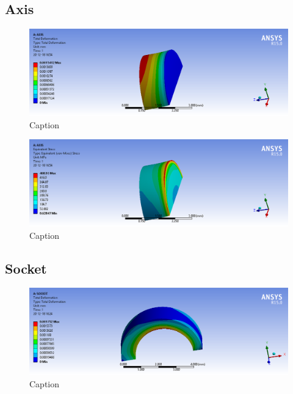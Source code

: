 \documentclass[a4paper 12pt]{article}
\begin{document}
\subsection{Axis}

\begin{figure}[!ht]
    \centering
    \includegraphics[width=1\textwidth]{images/AXIS_DISPLACEMENT.png}
    \caption{Caption}
    \label{fig:axis_deformation}
\end{figure}

\begin{figure}[!ht]
    \centering
    \includegraphics[width=1\textwidth]{images/AXIS_STRESS.png}
    \caption{Caption}
    \label{fig:axis_stress}
\end{figure}

\subsection{Socket}

\begin{figure}[!ht]
    \centering
    \includegraphics[width=1\textwidth]{images/SOCKET_DEFORMATION.png}
    \caption{Caption}
    \label{fig:socket_deformation}
\end{figure}
\end{document}
